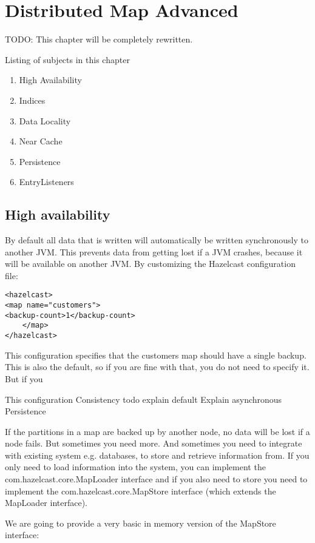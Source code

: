 \chapter{Distributed Map Advanced}

TODO: This chapter will be completely rewritten.

Listing of subjects in this chapter
\begin{enumerate}
\item High Availability
\item Indices
\item Data Locality
\item Near Cache
\item Persistence

\item EntryListeners
\end{enumerate}

\section{High availability}

By default all data that is written will automatically be written synchronously to another JVM. This prevents data from getting lost if a JVM crashes, because it will be available on another JVM. By customizing the Hazelcast configuration file:
\begin{verbatim}
<hazelcast> 
<map name="customers"> 
<backup-count>1</backup-count>
 	</map> 
</hazelcast>
\end{verbatim}

This configuration specifies that the customers map should have a single backup. This is also the default, so if you are fine with that, you do not need to specify it. But if you 

This configuration 
Consistency
todo explain default
Explain asynchronous
Persistence

If the partitions in a map are backed up by another node, no data will be lost if a node fails. But sometimes you need more. And sometimes you need to integrate with existing system e.g. databases, to store and retrieve information from. If you only need to load information into the system, you can implement the com.hazelcast.core.MapLoader interface and if you also need to store you need to implement the com.hazelcast.core.MapStore interface (which extends the MapLoader interface).

We are going to provide a very basic in memory version of the MapStore interface:

